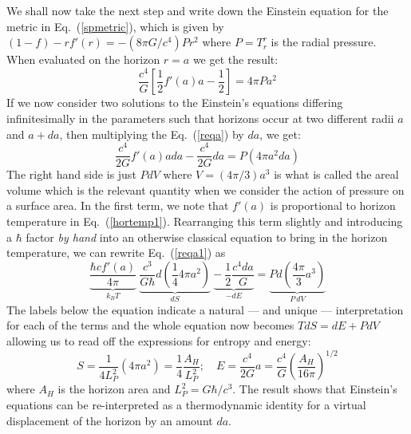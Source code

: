 \documentclass[12pt]{iopart}
\def\eq#1{{Eq.~(\ref{#1})}}
\begin{document}
We shall now take the next step and write down the
Einstein equation for the metric in \eq{spmetric}, which is given by 
$(1-f)-rf'(r)=-(8\pi G/c^4) Pr^2$ where $P = T^{r}_{r}$ is the radial pressure. When evaluated on the horizon $r=a$ we get the result:
\begin{equation}
\frac{c^4}{G}\left[\frac{1}{ 2} f'(a)a - \frac{1}{2}\right] = 4\pi P a^2
\label{reqa}
\end{equation}
If we now consider two solutions to the Einstein's equations differing infinitesimally in the parameters such that horizons occur at two different radii $a$ and $a+da$,
then multiplying the \eq{reqa} by $da$, we get: 
\begin{equation}
\frac{c^4}{2G}f'(a) a da - \frac{c^4}{2G}da = P(4\pi a^2 da)
\label{reqa1}
\end{equation}
The right hand side is just $PdV$ where $V=(4\pi/3)a^3$ is what is called the areal volume which is the relevant quantity when we consider the action of pressure on a surface area. In the first term, we note that $f'(a)$ is proportional to horizon temperature in \eq{hortemp1}. Rearranging this term slightly
and introducing a $\hbar$ factor \textit{by hand} into an otherwise classical equation
to bring in the horizon temperature, we can rewrite \eq{reqa1} as
\begin{equation}
   \underbrace{\frac{{{\hbar}} cf'(a)}{4\pi}}_{\displaystyle{k_BT}}
    \ \underbrace{\frac{c^3}{G{{\hbar}}}d\left( \frac{1}{ 4} 4\pi a^2 \right)}_{
    \displaystyle{dS}}
  \ \underbrace{-\ \frac{1}{2}\frac{c^4 da}{G}}_{
    \displaystyle{-dE}}
 = \underbrace{P d \left( \frac{4\pi}{ 3}  a^3 \right)  }_{
    \displaystyle{P\, dV}}
\label{EHthermo}
\end{equation}
The labels below the equation indicate a natural --- and unique --- interpretation for each of the terms and the whole equation now becomes $TdS=dE+PdV$ allowing us to read off the expressions for entropy and energy:
\begin{equation}
 S=\frac{1}{ 4L_P^2} (4\pi a^2) = \frac{1}{ 4} \frac{A_H}{ L_P^2}; \quad E=\frac{c^4}{ 2G} a
    =\frac{c^4}{G}\left( \frac{A_H}{ 16 \pi}\right)^{1/2}
\end{equation}
where $A_H$ is the horizon area and $L_P^2=G\hbar/c^3$. The result shows that Einstein's equations can be re-interpreted as a thermodynamic
identity for a virtual displacement of the horizon by an amount $da$. 
\end{document}
